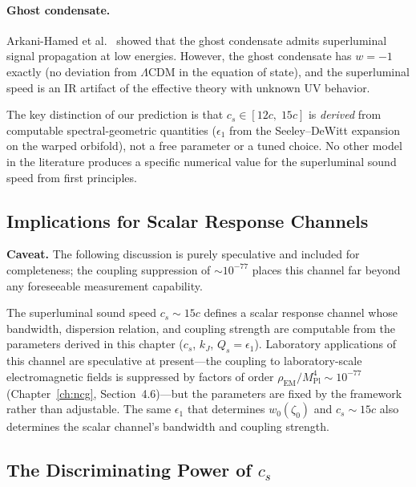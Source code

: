 \paragraph{Ghost condensate.}
Arkani-Hamed et al.~\cite{ch5:ArkaniHamed2004} showed that the ghost condensate admits superluminal signal propagation at low energies. However, the ghost condensate has $w = -1$ exactly (no deviation from $\Lambda$CDM in the equation of state), and the superluminal speed is an IR artifact of the effective theory with unknown UV behavior.

\medskip

The key distinction of our prediction is that $c_s \in [12c,\; 15c]$ is \emph{derived} from computable spectral-geometric quantities ($\epsilon_1$ from the Seeley--DeWitt expansion on the warped orbifold), not a free parameter or a tuned choice. No other model in the literature produces a specific numerical value for the superluminal sound speed from first principles.

\subsection{Implications for Scalar Response Channels}
\label{sec:5-engineering}

\noindent\textbf{Caveat.} The following discussion is purely speculative and included for completeness; the coupling suppression of $\sim 10^{-77}$ places this channel far beyond any foreseeable measurement capability.

\medskip

The superluminal sound speed $c_s \sim 15c$ defines a scalar response channel whose bandwidth, dispersion relation, and coupling strength are computable from the parameters derived in this chapter ($c_s$, $k_J$, $Q_s = \epsilon_1$). Laboratory applications of this channel are speculative at present---the coupling to laboratory-scale electromagnetic fields is suppressed by factors of order $\rho_{\mathrm{EM}}/M_{\mathrm{Pl}}^4 \sim 10^{-77}$ (Chapter~\ref{ch:ncg}, Section~4.6)---but the parameters are fixed by the framework rather than adjustable. The same $\epsilon_1$ that determines $w_0(\zeta_0)$ and $c_s \sim 15c$ also determines the scalar channel's bandwidth and coupling strength.

\subsection{The Discriminating Power of \texorpdfstring{$c_s$}{cs}}
\label{sec:5-discriminating}

